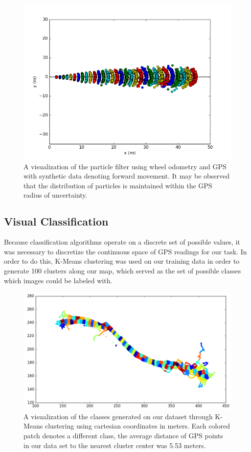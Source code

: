 \documentclass[letterpaper, 12 pt, conference]{ieeeconf}  %
\begin{document}
\begin{figure}[h]
\centering
\includegraphics[scale=0.60]{With_GPS}
\caption{A visualization of the particle filter using wheel odometry and GPS with synthetic data denoting forward movement. It may be observed that the distribution of particles is maintained within the GPS radius of uncertainty. }
\label{with_gps}
\end{figure}

\subsection{Visual Classification}

Because classification algorithms operate on a discrete set of possible values, it was necessary to discretize the continuous space of GPS readings for our task. In order to do this, K-Means clustering was used on our training data in order to generate 100 clusters along our map, which served as the set of possible classes which images could be labeled with. 
\par 

\begin{figure}[h]
\centering
\includegraphics[scale=0.5]{clustering}
\caption{A visualization of the classes generated on our dataset through K-Means clustering using cartesian coordinates in meters. Each colored patch denotes a different class, the average distance of GPS points in our data set to the nearest cluster center was 5.53 meters.}
\label{clustering}
\end{figure}
\end{document}
